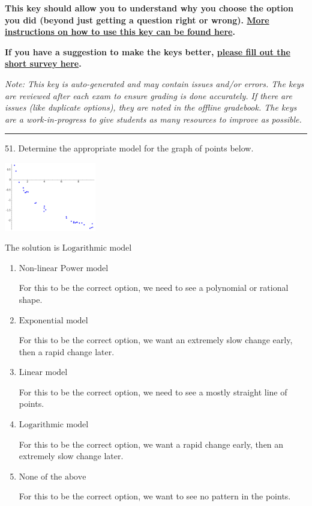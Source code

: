 \documentclass{extbook}[14pt]
\begin{document}
\textbf{This key should allow you to understand why you choose the option you did (beyond just getting a question right or wrong). \href{https://xronos.clas.ufl.edu/mac1105spring2020/courseDescriptionAndMisc/Exams/LearningFromResults}{More instructions on how to use this key can be found here}.}

\textbf{If you have a suggestion to make the keys better, \href{https://forms.gle/CZkbZmPbC9XALEE88}{please fill out the short survey here}.}

\textit{Note: This key is auto-generated and may contain issues and/or errors. The keys are reviewed after each exam to ensure grading is done accurately. If there are issues (like duplicate options), they are noted in the offline gradebook. The keys are a work-in-progress to give students as many resources to improve as possible.}

\rule{\textwidth}{0.4pt}

51. Determine the appropriate model for the graph of points below.
\begin{center} \includegraphics[width=0.3\textwidth]{../Figures/identifyModelGraph11A.png} \end{center} 

The solution is $ \text{Logarithmic model} $ 

\begin{enumerate}[label=\Alph*.] 
\item $ \text{Non-linear Power model} $ 

 For this to be the correct option, we need to see a polynomial or rational shape. 
\item $ \text{Exponential model} $ 

 For this to be the correct option, we want an extremely slow change early, then a rapid change later. 
\item $ \text{Linear model} $ 

 For this to be the correct option, we need to see a mostly straight line of points. 
\item $ \text{Logarithmic model} $ 

 For this to be the correct option, we want a rapid change early, then an extremely slow change later. 
\item $ \text{None of the above} $ 

 For this to be the correct option, we want to see no pattern in the points. 
\end{enumerate} 
 
\end{document}
